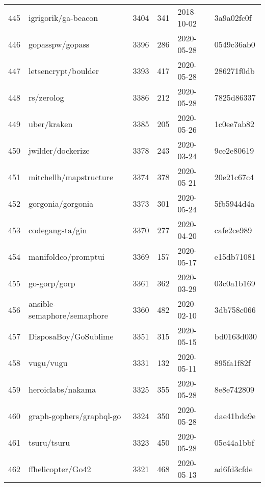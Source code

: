 \begin{longtable}{llrrll}
    445 &                                igrigorik/ga-beacon &   3404 &    341 & 2018-10-02 &  3a9a02fc0f \\
    446 &                                    gopasspw/gopass &   3396 &    286 & 2020-05-28 &  0549c36ab0 \\
    447 &                                letsencrypt/boulder &   3393 &    417 & 2020-05-28 &  286271f0db \\
    448 &                                         rs/zerolog &   3386 &    212 & 2020-05-28 &  7825d86337 \\
    449 &                                        uber/kraken &   3385 &    205 & 2020-05-26 &  1c0ee7ab82 \\
    450 &                                  jwilder/dockerize &   3378 &    243 & 2020-03-24 &  9ce2e80619 \\
    451 &                             mitchellh/mapstructure &   3374 &    378 & 2020-05-21 &  20e21c67c4 \\
    452 &                                  gorgonia/gorgonia &   3373 &    301 & 2020-05-24 &  5fb5944d4a \\
    453 &                                    codegangsta/gin &   3370 &    277 & 2020-04-20 &  cafe2ce989 \\
    454 &                                manifoldco/promptui &   3369 &    157 & 2020-05-17 &  e15db71081 \\
    455 &                                       go-gorp/gorp &   3361 &    362 & 2020-03-29 &  03c0a1b169 \\
    456 &                        ansible-semaphore/semaphore &   3360 &    482 & 2020-02-10 &  3db758c066 \\
    457 &                               DisposaBoy/GoSublime &   3351 &    315 & 2020-05-15 &  bd0163d030 \\
    458 &                                          vugu/vugu &   3331 &    132 & 2020-05-11 &  895fa1f82f \\
    459 &                                  heroiclabs/nakama &   3325 &    355 & 2020-05-28 &  8e8e742809 \\
    460 &                           graph-gophers/graphql-go &   3324 &    350 & 2020-05-28 &  dae41bde9e \\
    461 &                                        tsuru/tsuru &   3323 &    450 & 2020-05-28 &  05c44a1bbf \\
    462 &                                  ffhelicopter/Go42 &   3321 &    468 & 2020-05-13 &  ad6fd3cfde \\

\end{longtable}
